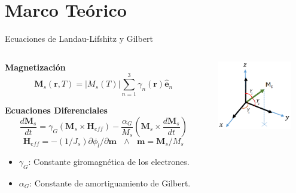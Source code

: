 \documentclass{beamer}
\begin{document}
\section{Marco Teórico}

\begin{frame}{Ecuaciones de Landau-Lifshitz y Gilbert}
    \begin{columns}
    \begin{column}{0.5\textwidth}
        \footnotesize
        \textbf{Magnetización}
        \[ \bm{M}_s (\bm{r},T) = |M_s (T)| \sum_{n=1}^3 \gamma_n (\bm{r}) \hat{\bm{e}}_n \]
        
        \vspace{0.1cm}

        \textbf{Ecuaciones Diferenciales}
        \[ \frac{d \bm{M}_s}{dt} = \gamma_G (\bm{M}_s \times \bm{H}_{eff}) - \frac{\alpha_G}{M_s}(\bm{M}_s \times \frac{d \bm{M}_s}{dt})\]
        \[ \bm{H}_{eff} = - (1/J_s) \partial \phi_l / \partial \bm{m} ~~~ \wedge ~~~ \bm{m} = \bm{M}_s/M_s \]

        \vspace{0.2cm}
        
        \begin{itemize}
            \item $\gamma_G$: Constante giromagnética de los electrones.
            \item $\alpha_G$: Constante de amortiguamiento de Gilbert.
        \end{itemize}
    \end{column}
    \begin{column}{0.5\textwidth}
            \centering
            \includegraphics[width=3.5cm,height=3cm]{pic/CosenosDirectores.png}

            \vspace{0.5cm}
            

\end{column}
\end{columns}
\end{frame}
\end{document}
